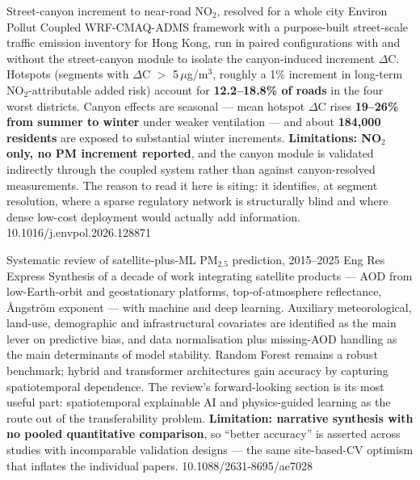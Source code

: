 \documentclass[10pt]{article}
\begin{document}
{Street-canyon increment to near-road NO$_2$, resolved for a whole city}
{Environ Pollut}
{Coupled WRF-CMAQ-ADMS framework with a purpose-built street-scale traffic emission
inventory for Hong Kong, run in paired configurations with and without the street-canyon
module to isolate the canyon-induced increment $\Delta$C. Hotspots (segments with
$\Delta$C $>$ 5\,$\mu$g/m$^3$, roughly a 1\% increment in long-term NO$_2$-attributable
added risk) account for \textbf{12.2--18.8\% of roads} in the four worst districts.
Canyon effects are seasonal --- mean hotspot $\Delta$C rises \textbf{19--26\% from summer
to winter} under weaker ventilation --- and about \textbf{184{,}000 residents} are exposed
to substantial winter increments. \textbf{Limitations: NO$_2$ only, no PM increment
reported}, and the canyon module is validated indirectly through the coupled system rather
than against canyon-resolved measurements. The reason to read it here is siting: it
identifies, at segment resolution, where a sparse regulatory network is structurally blind
and where dense low-cost deployment would actually add information.}
{10.1016/j.envpol.2026.128871}

{Systematic review of satellite-plus-ML PM$_{2.5}$ prediction, 2015--2025}
{Eng Res Express}
{Synthesis of a decade of work integrating satellite products --- AOD from low-Earth-orbit
and geostationary platforms, top-of-atmosphere reflectance, {\AA}ngstr\"om exponent ---
with machine and deep learning. Auxiliary meteorological, land-use, demographic and
infrastructural covariates are identified as the main lever on predictive bias, and data
normalisation plus missing-AOD handling as the main determinants of model stability.
Random Forest remains a robust benchmark; hybrid and transformer architectures gain
accuracy by capturing spatiotemporal dependence. The review's forward-looking section is
its most useful part: spatiotemporal explainable AI and physics-guided learning as the
route out of the transferability problem. \textbf{Limitation: narrative synthesis with no
pooled quantitative comparison}, so ``better accuracy'' is asserted across studies with
incomparable validation designs --- the same site-based-CV optimism that inflates the
individual papers.}
{10.1088/2631-8695/ae7028}
\end{document}
